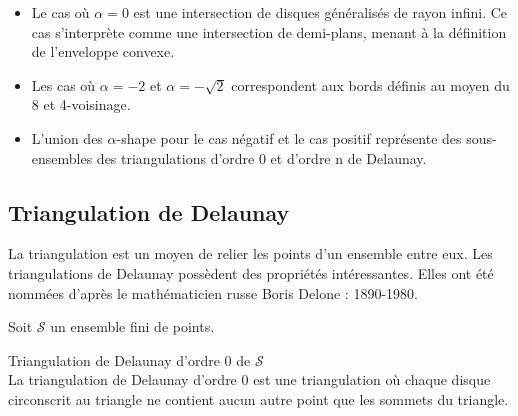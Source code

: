 \begin{itemize}
  \item Le cas où $\alpha = 0$ est une intersection de disques généralisés de rayon infini. Ce cas s'interprète comme une intersection de demi-plans, menant à la définition de l'enveloppe convexe.
  \item Les cas où $\alpha = -2$ et $\alpha = -\sqrt{2}$ correspondent aux bords définis au moyen du 8 et 4-voisinage. 
  \item L'union des $\alpha$-shape \cite{EdeKirSei83} pour le cas négatif et le cas positif représente des sous-ensembles des triangulations d'ordre 0 et d'ordre n de Delaunay.   
\end{itemize}
 
\subsection{Triangulation de Delaunay}

La triangulation est un moyen de relier les points d'un ensemble entre eux. Les triangulations de Delaunay possèdent des propriétés intéressantes.  Elles ont été nommées d'après le mathématicien russe Boris Delone : 1890-1980.

Soit $\mathcal{S}$ un ensemble fini de points. 

\begin{Definition}{Triangulation de Delaunay d'ordre 0 de $\mathcal{S}$}\\
\label{def:tri-del-0}
  La triangulation de Delaunay d'ordre 0 est une triangulation où chaque disque circonscrit au triangle ne contient aucun autre point que les sommets du triangle.
\end{Definition}

